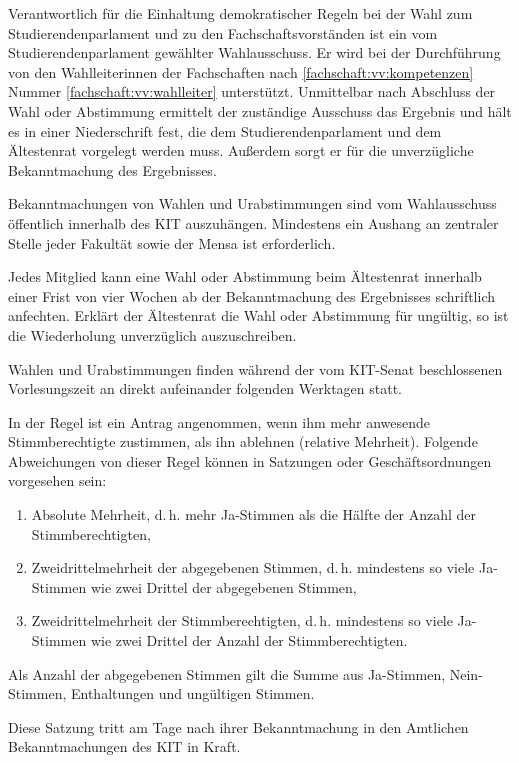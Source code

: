 \begin{jurdoc}
Verantwortlich für die Einhaltung demokratischer Regeln bei der Wahl zum Studierendenparlament und zu den Fachschaftsvorständen ist ein vom Studierendenparlament gewählter Wahlausschuss. Er wird bei der Durchführung von den Wahlleiterinnen der Fachschaften nach \ref{fachschaft:vv:kompetenzen} Nummer \ref{fachschaft:vv:wahlleiter} unterstützt. Unmittelbar nach Abschluss der Wahl oder Abstimmung ermittelt der zuständige Ausschuss das Ergebnis und hält es in einer Niederschrift fest, die dem Studierendenparlament und dem Ältestenrat vorgelegt werden muss. Außerdem sorgt er für die unverzügliche Bekanntmachung des Ergebnisses. \label{grundsaetze:wahlen:wahlausschuss}

Bekanntmachungen von Wahlen und Urabstimmungen sind vom Wahlausschuss öffentlich innerhalb des KIT auszuhängen. Mindestens ein Aushang an zentraler Stelle jeder Fakultät sowie der Mensa ist erforderlich. \label{grundsaetze:wahlen:bekanntmachung}

Jedes Mitglied kann eine Wahl oder Abstimmung beim Ältestenrat innerhalb einer Frist von vier Wochen ab der Bekanntmachung des Ergebnisses schriftlich anfechten. Erklärt der Ältestenrat die Wahl oder Abstimmung für ungültig, so ist die Wiederholung unverzüglich auszuschreiben. \label{grundsaetze:wahlen:wahlanfechtung}

Wahlen und Urabstimmungen finden während der vom KIT-Senat beschlossenen Vorlesungszeit an direkt aufeinander folgenden Werktagen statt.

In der Regel ist ein Antrag angenommen, wenn ihm mehr anwesende Stimmberechtigte zustimmen, als ihn ablehnen (relative Mehrheit). Folgende Abweichungen von dieser Regel können in Satzungen oder Geschäftsordnungen vorgesehen sein:
\begin{enumerate}
\item Absolute Mehrheit, d.\,h. mehr Ja-Stimmen als die Hälfte der Anzahl der Stimmberechtigten,
\item Zweidrittelmehrheit der abgegebenen Stimmen, d.\,h. mindestens so viele Ja-Stimmen wie zwei Drittel der abgegebenen Stimmen,
\item Zweidrittelmehrheit der Stimmberechtigten, d.\,h. mindestens so viele Ja-Stimmen wie zwei Drittel der Anzahl der Stimmberechtigten.
\end{enumerate}
Als Anzahl der abgegebenen Stimmen gilt die Summe aus Ja-Stimmen, Nein-Stimmen, Enthaltungen und ungültigen Stimmen.


\label{grundsaetze:inkrafttreten}
Diese Satzung tritt am Tage nach ihrer Bekanntmachung in den Amtlichen Bekanntmachungen des KIT in Kraft.


\end{jurdoc}
